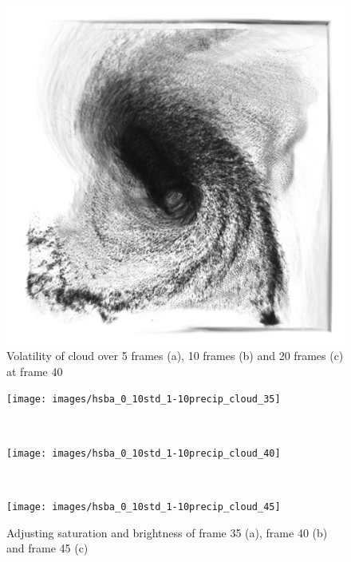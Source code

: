 \begin{figure}
\begin{minipage}{.33\textwidth}
	\subcaption{}
\end{minipage}~
\begin{minipage}{.33\textwidth}
	\includegraphics[width=1\linewidth]{figures/hurricane_std20_gray_40}
	\subcaption{}
\end{minipage}
\caption{Volatility of cloud over 5 frames (a), 10 frames (b) and 20 frames (c)  at frame 40}
\label{fig:hurricane_std}
\end{figure}

\begin{figure}
\centering
\begin{minipage}{.33\textwidth}
\texttt{[image: images/hsba\_0\_10std\_1-10precip\_cloud\_35]}
\subcaption{}
\end{minipage}~
\begin{minipage}{.33\textwidth}
\texttt{[image: images/hsba\_0\_10std\_1-10precip\_cloud\_40]}
\subcaption{}
\end{minipage}~
\begin{minipage}{.33\textwidth}
\texttt{[image: images/hsba\_0\_10std\_1-10precip\_cloud\_45]}
\subcaption{}
\end{minipage}
\caption{Adjusting saturation and brightness of frame 35 (a), frame 40 (b) and frame 45 (c)}
\label{fig:hurricane_hsba}
\end{figure}

